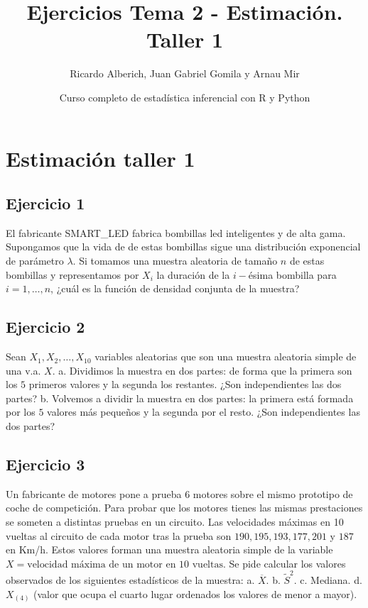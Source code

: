 \documentclass[]{article}
\title{Ejercicios Tema 2 - Estimación. Taller 1}
\author{Ricardo Alberich, Juan Gabriel Gomila y Arnau Mir}
\date{Curso completo de estadística inferencial con R y Python}
\begin{document}
\maketitle

{
\hypersetup{linkcolor=blue}
\setcounter{tocdepth}{2}
\tableofcontents
}
\hypertarget{estimaciuxf3n-taller-1}{%
\section{Estimación taller 1}\label{estimaciuxf3n-taller-1}}

\hypertarget{ejercicio-1}{%
\subsection{Ejercicio 1}\label{ejercicio-1}}

El fabricante SMART\_LED fabrica bombillas led inteligentes y de alta
gama. Supongamos que la vida de de estas bombillas sigue una
distribución exponencial de parámetro \(\lambda\). Si tomamos una
muestra aleatoria de tamaño \(n\) de estas bombillas y representamos por
\(X_i\) la duración de la \(i-\)ésima bombilla para \(i=1,\ldots,n\),
¿cuál es la función de densidad conjunta de la muestra?

\hypertarget{ejercicio-2}{%
\subsection{Ejercicio 2}\label{ejercicio-2}}

Sean \(X_1,X_2,\ldots,X_{10}\) variables aleatorias que son una muestra
aleatoria simple de una v.a. \(X\). a. Dividimos la muestra en dos
partes: de forma que la primera son los \(5\) primeros valores y la
segunda los restantes. ¿Son independientes las dos partes? b. Volvemos a
dividir la muestra en dos partes: la primera está formada por los \(5\)
valores más pequeños y la segunda por el resto. ¿Son independientes las
dos partes?

\hypertarget{ejercicio-3}{%
\subsection{Ejercicio 3}\label{ejercicio-3}}

Un fabricante de motores pone a prueba \(6\) motores sobre el mismo
prototipo de coche de competición. Para probar que los motores tienes
las mismas prestaciones se someten a distintas pruebas en un circuito.
Las velocidades máximas en 10 vueltas al circuito de cada motor tras la
prueba son \(190,195,193,177,201\) y \(187\) en Km/h. Estos valores
forman una muestra aleatoria simple de la variable
\(X=\mbox{velocidad máxima de un motor en 10 vueltas.}\) Se pide
calcular los valores observados de los siguientes estadísticos de la
muestra: a. \(\overline{X}\). b. \(\tilde{S}^2\). c. Mediana. d.
\(X_{(4)}\) (valor que ocupa el cuarto lugar ordenados los valores de
menor a mayor).
\end{document}
